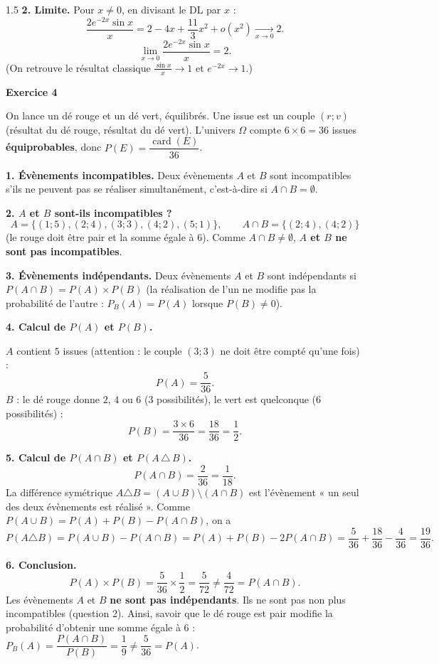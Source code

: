 \documentclass[12pt]{article}
\begin{document}
\begin{spacing}{1.5}
\textbf{2. Limite.} Pour $x\neq0$, en divisant le DL par $x$ :
\[
\frac{2e^{-2x}\sin x}{x}=2-4x+\frac{11}{3}x^2+o(x^2)\xrightarrow[x\to0]{}2 .
\]
\[
\boxed{\lim_{x\to0}\frac{2e^{-2x}\sin x}{x}=2}.
\]
(On retrouve le résultat classique $\frac{\sin x}{x}\to1$ et $e^{-2x}\to1$.)

\medskip\textbf{Exercice 4}

On lance un dé rouge et un dé vert, équilibrés. Une issue est un couple $(r;v)$ (résultat du dé rouge, résultat du dé vert). L'univers $\Omega$ compte $6\times6=36$ issues \textbf{équiprobables}, donc $P(E)=\dfrac{\operatorname{card}(E)}{36}$.

\textbf{1. Évènements incompatibles.} Deux évènements $A$ et $B$ sont incompatibles s'ils ne peuvent pas se réaliser simultanément, c'est-à-dire si $A\cap B=\emptyset$.

\textbf{2. $A$ et $B$ sont-ils incompatibles ?}
\[
A=\{(1;5),(2;4),(3;3),(4;2),(5;1)\},\qquad A\cap B=\{(2;4),(4;2)\}
\]
(le rouge doit être pair et la somme égale à 6). Comme $A\cap B\neq\emptyset$, \textbf{$A$ et $B$ ne sont pas incompatibles}.

\textbf{3. Évènements indépendants.} Deux évènements $A$ et $B$ sont indépendants si $P(A\cap B)=P(A)\times P(B)$ (la réalisation de l'un ne modifie pas la probabilité de l'autre : $P_B(A)=P(A)$ lorsque $P(B)\neq0$).

\textbf{4. Calcul de $P(A)$ et $P(B)$.}

$A$ contient $5$ issues (attention : le couple $(3;3)$ ne doit être compté qu'une fois) :
\[
P(A)=\frac{5}{36}.
\]
$B$ : le dé rouge donne $2$, $4$ ou $6$ ($3$ possibilités), le vert est quelconque ($6$ possibilités) :
\[
P(B)=\frac{3\times6}{36}=\frac{18}{36}=\frac12 .
\]

\textbf{5. Calcul de $P(A\cap B)$ et $P(A\,\triangle\,B)$.}
\[
P(A\cap B)=\frac{2}{36}=\frac1{18}.
\]
La différence symétrique $A\triangle B=(A\cup B)\setminus(A\cap B)$ est l'évènement « un seul des deux évènements est réalisé ». Comme $P(A\cup B)=P(A)+P(B)-P(A\cap B)$, on a
\[
P(A\triangle B)=P(A\cup B)-P(A\cap B)=P(A)+P(B)-2P(A\cap B)=\frac{5}{36}+\frac{18}{36}-\frac{4}{36}=\frac{19}{36}.
\]

\textbf{6. Conclusion.}
\[
P(A)\times P(B)=\frac{5}{36}\times\frac12=\frac{5}{72}\neq\frac{4}{72}=P(A\cap B).
\]
Les évènements $A$ et $B$ \textbf{ne sont pas indépendants}. Ils ne sont pas non plus incompatibles (question 2). Ainsi, savoir que le dé rouge est pair modifie la probabilité d'obtenir une somme égale à 6 : $P_B(A)=\dfrac{P(A\cap B)}{P(B)}=\dfrac{1}{9}\neq\dfrac{5}{36}=P(A)$.

\end{spacing}
\end{document}
